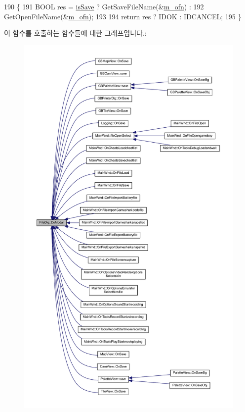 \begin{DoxyCode}
190 \{
191   BOOL res = \mbox{\hyperlink{class_file_dlg_aea50dcea1e8ef52d9b61f9cd37a69c0f}{isSave}} ? GetSaveFileName(&\mbox{\hyperlink{class_file_dlg_a3ee514d5dca456bd90c598af5412269a}{m\_ofn}}) :
192     GetOpenFileName(&\mbox{\hyperlink{class_file_dlg_a3ee514d5dca456bd90c598af5412269a}{m\_ofn}});
193 
194   \textcolor{keywordflow}{return} res ? IDOK : IDCANCEL;
195 \}
\end{DoxyCode}
이 함수를 호출하는 함수들에 대한 그래프입니다.\+:
\nopagebreak
\begin{figure}[H]
\begin{center}
\leavevmode
\includegraphics[height=550pt]{class_file_dlg_a45b5a0d6b2d8a9b973864ab2b36e16e0_icgraph}
\end{center}
\end{figure}
\mbox{\label{class_file_dlg_adee4c9560d3c2668654c50970f8e7f12}} 
